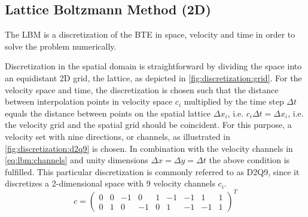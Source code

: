 \subsection{Lattice Boltzmann Method (2D)}

The \gls{LBM} is a discretization of the \gls{BTE} in space, velocity and time in order to solve the problem numerically.

Discretization in the spatial domain is straightforward by dividing the space into an equidistant 2D grid, the lattice, as depicted in \cref{fig:discretization:grid}. For the velocity space and time, the discretization is chosen such that the distance between interpolation points in velocity space $c_i$ multiplied by the time step $\Delta t$ equals the distance between points on the spatial lattice $\Delta x_i$, i.e. $c_i \Delta t = \Delta x_i$, i.e. the velocity grid and the spatial grid should be coincident. For this purpose, a velocity set with nine directions, or channels, as illustrated in \cref{fig:discretization:d2q9} is chosen. In combination with the velocity channels in \cref{eq:lbm:channels} and unity dimensions $\Delta x = \Delta y = \Delta t$ the above condition is fulfilled. This particular discretization is commonly referred to as D2Q9, since it discretizes a 2-dimensional space with 9 velocity channels $c_i$.
\begin{equation}
    c = \begin{pmatrix}
        0 & 0 & -1 & 0 & 1 & -1 & -1 & 1 & 1 \\
        0 & 1 & 0 & -1 & 0 & 1 & -1 & -1 & 1
    \end{pmatrix}^T
    \label{eq:lbm:channels}
\end{equation}
